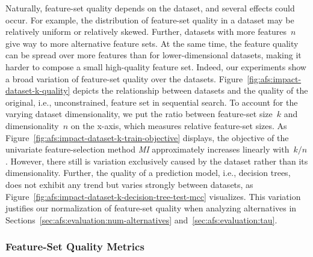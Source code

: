 \documentclass{article}
\theoremstyle{definition}
\begin{document}
Naturally, feature-set quality depends on the dataset, and several effects could occur.
For example, the distribution of feature-set quality in a dataset may be relatively uniform or relatively skewed.
Further, datasets with more features~$n$ give way to more alternative feature sets.
At the same time, the feature quality can be spread over more features than for lower-dimensional datasets, making it harder to compose a small high-quality feature set.
Indeed, our experiments show a broad variation of feature-set quality over the datasets.
Figure~\ref{fig:afs:impact-dataset-k-quality} depicts the relationship between datasets and the quality of the original, i.e., unconstrained, feature set in sequential search.
To account for the varying dataset dimensionality, we put the ratio between feature-set size~$k$ and dimensionality~$n$ on the x-axis, which measures relative feature-set sizes.
As Figure~\ref{fig:afs:impact-dataset-k-train-objective} displays, the objective of the univariate feature-selection method \emph{MI} approximately increases linearly with~$k/n$.
However, there still is variation exclusively caused by the dataset rather than its dimensionality.
Further, the quality of a prediction model, i.e., decision trees, does not exhibit any trend but varies strongly between datasets, as Figure~\ref{fig:afs:impact-dataset-k-decision-tree-test-mcc} visualizes.
This variation justifies our normalization of feature-set quality when analyzing alternatives in Sections~\ref{sec:afs:evaluation:num-alternatives} and~\ref{sec:afs:evaluation:tau}.

\subsubsection{Feature-Set Quality Metrics}
\label{sec:afs:appendix:evaluation:metrics}
\end{document}
